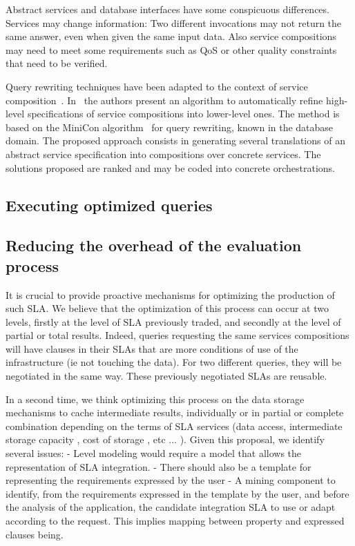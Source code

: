 Abstract services and database interfaces have some conspicuous differences.
Services may change information: Two different invocations may not return the same answer, even when given the same input data.
Also service compositions may need to meet some requirements such as QoS or other quality constraints that need to be verified.

Query rewriting techniques have been adapted to the context of service composition~\cite{queryRewriting}. 
In~\cite{UmbertoICWE2013} the authors present an algorithm to automatically refine high-level specifications of service compositions into lower-level ones. 
The method is based on the MiniCon algorithm~\cite{PH01} for query rewriting,  known in the database domain.
The proposed approach consists in generating several translations of an abstract service specification into compositions
over concrete  services. 
The solutions proposed are ranked and may be coded into concrete orchestrations. 


\subsection{Executing optimized queries}
\label{sec:queryOpt}


\subsection{Reducing the overhead of the evaluation process}
\label{sec:queryProcessOpt}
  
 It is  crucial to provide proactive mechanisms for optimizing the production of such SLA. We believe that the optimization of this process can occur at two levels, firstly at the level of SLA previously traded, and secondly at the level of partial or total results. Indeed, queries requesting the same services compositions will have clauses in their SLAs that are more conditions of use of the infrastructure (ie not touching the data). For two different queries, they will be negotiated in the same way. These previously negotiated SLAs are reusable.

In a second time, we think optimizing this process on the data storage mechanisms to cache intermediate results, individually or in partial or complete combination depending on the terms of SLA services (data access, intermediate storage capacity , cost of storage , etc ... ).
Given this proposal, we identify several issues:
- Level modeling would require a model that allows the representation of SLA integration.
- There should also be a template for representing the requirements expressed by the user
- A mining component to identify, from the requirements expressed in the template by the user, and before the analysis of the application, the candidate integration SLA to use or adapt according to the request. This implies mapping between property and expressed clauses being.
